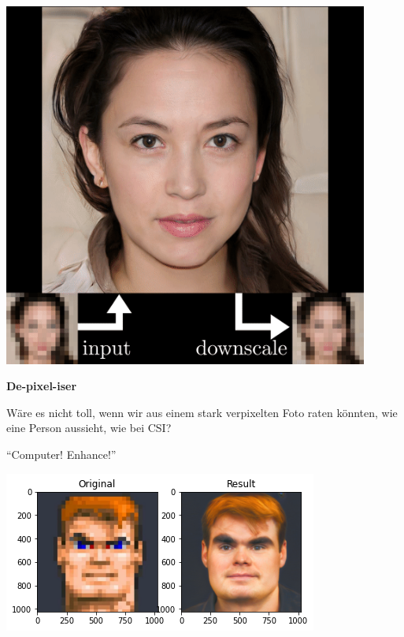 \documentclass[aspectratio=169,usenames,dvipsnames]{beamer}
\begin{document}
\begin{frame}
\begin{minipage}{.5\textwidth}
\includegraphics[width=0.9\textwidth, keepaspectratio]{images/step13}
\end{minipage}\begin{minipage}{.5\textwidth}
\textbf{De-pixel-iser}
\bigskip

Wäre es nicht toll, wenn wir aus einem stark verpixelten Foto raten könnten, wie eine Person aussieht, wie bei CSI?
\bigskip

``Computer! Enhance!''
\end{minipage}
\end{frame}

\begin{frame}
\begin{center}
\includegraphics[scale=1]{images/doomguy} 
\end{center}
\end{frame}
\end{document}
